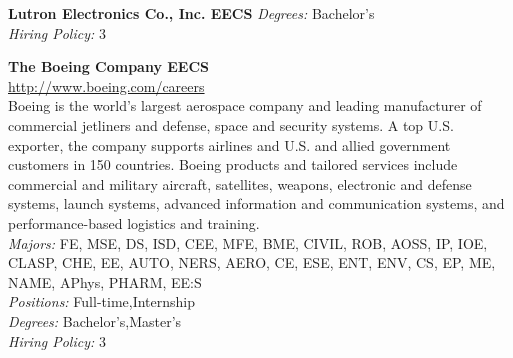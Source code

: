 \documentclass[twoside]{article}
\begin{document}
\begin{center}
\begin{multicols}{2}
\begin{minipage}{.95\columnwidth}{\Large\bf Lutron Electronics Co., Inc. \hfill EECS}
    \emph{Degrees:} Bachelor's\\
    \emph{Hiring Policy:} 3\\
\end{minipage}
 \begin{minipage}{.95\columnwidth}{\Large\bf The Boeing Company \hfill EECS}\\
    \url{http://www.boeing.com/careers}\\
    Boeing is the world's largest aerospace company and leading manufacturer of commercial jetliners and defense, space and security systems. A top U.S. exporter, the company supports airlines and U.S. and allied government customers in 150 countries. Boeing products and tailored services include commercial and military aircraft, satellites, weapons, electronic and defense systems, launch systems, advanced information and communication systems, and performance-based logistics and training.\\
    \emph{Majors:} FE, MSE, DS, ISD, CEE, MFE, BME, CIVIL, ROB, AOSS, IP, IOE, CLASP, CHE, EE, AUTO, NERS, AERO, CE, ESE, ENT, ENV, CS, EP, ME, NAME, APhys, PHARM, EE:S\\
    \emph{Positions:} Full-time,Internship\\
    \emph{Degrees:} Bachelor's,Master's\\
    \emph{Hiring Policy:} 3\\
\end{minipage}
 \end{multicols}\end{center}
    \startcompanysection
\end{document}

